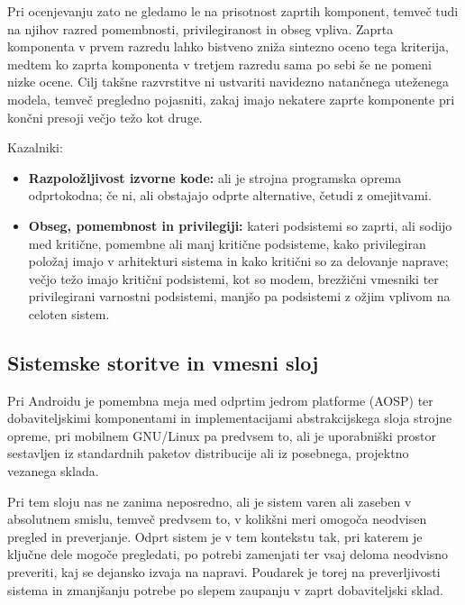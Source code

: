 \documentclass[a4paper,12pt,openright]{book}
\begin{document}
Pri ocenjevanju zato ne gledamo le na prisotnost zaprtih komponent, temveč tudi na njihov razred pomembnosti, privilegiranost in obseg vpliva.
Zaprta komponenta v prvem razredu lahko bistveno zniža sintezno oceno tega kriterija, medtem ko zaprta komponenta v tretjem razredu sama po sebi še ne pomeni nizke ocene.
Cilj takšne razvrstitve ni ustvariti navidezno natančnega uteženega modela, temveč pregledno pojasniti, zakaj imajo nekatere zaprte komponente pri končni presoji večjo težo kot druge.

Kazalniki:
\begin{itemize}
    \item \textbf{Razpoložljivost izvorne kode:} ali je strojna programska oprema odprtokodna; če ni, ali obstajajo odprte alternative, četudi z omejitvami.
    \item \textbf{Obseg, pomembnost in privilegiji:} kateri podsistemi so zaprti, ali sodijo med kritične, pomembne ali manj kritične podsisteme, kako privilegiran položaj imajo v arhitekturi sistema in kako kritični so za delovanje naprave; večjo težo imajo kritični podsistemi, kot so modem, brezžični vmesniki ter privilegirani varnostni podsistemi, manjšo pa podsistemi z ožjim vplivom na celoten sistem.
\end{itemize}

\subsection{Sistemske storitve in vmesni sloj}
\label{subsec:model_services}

Pri Androidu je pomembna meja med odprtim jedrom platforme (AOSP) ter dobaviteljskimi komponentami in implementacijami abstrakcijskega sloja strojne opreme, pri mobilnem GNU/Linux pa predvsem to, ali je uporabniški prostor sestavljen iz standardnih paketov distribucije ali iz posebnega, projektno vezanega sklada.

Pri tem sloju nas ne zanima neposredno, ali je sistem varen ali zaseben v absolutnem smislu, temveč predvsem to, v kolikšni meri omogoča neodvisen pregled in preverjanje.
Odprt sistem je v tem kontekstu tak, pri katerem je ključne dele mogoče pregledati, po potrebi zamenjati ter vsaj deloma neodvisno preveriti, kaj se dejansko izvaja na napravi.
Poudarek je torej na preverljivosti sistema in zmanjšanju potrebe po slepem zaupanju v zaprt dobaviteljski sklad.
\end{document}
